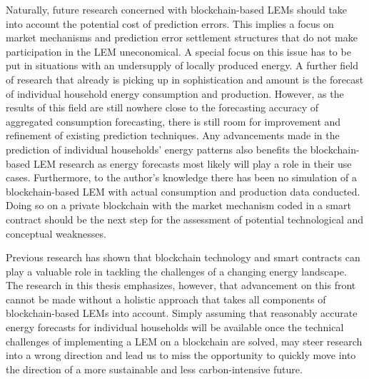 Naturally, future research concerned with blockchain-based LEMs should take into account the potential cost of prediction errors. This implies a focus on market mechanisms and prediction error settlement structures that do not make participation in the LEM uneconomical. A special focus on this issue has to be put in situations with an undersupply of locally produced energy. A further field of research that already is picking up in sophistication and amount is the forecast of individual household energy consumption and production. However, as the results of this field are still nowhere close to the forecasting accuracy of aggregated consumption forecasting, there is still room for improvement and refinement of existing prediction techniques. Any advancements made in the prediction of individual households' energy patterns also benefits the blockchain-based LEM research as energy forecasts most likely will play a role in their use cases. Furthermore, to the author's knowledge there has been no simulation of a blockchain-based LEM with actual consumption and production data conducted. Doing so on a private blockchain with the market mechanism coded in a smart contract should be the next step for the assessment of potential technological and conceptual weaknesses.

Previous research has shown that blockchain technology and smart contracts can play a valuable role in tackling the challenges of a changing energy landscape. The research in this thesis emphasizes, however, that advancement on this front cannot be made without a holistic approach that takes all components of blockchain-based LEMs into account. Simply assuming that reasonably accurate energy forecasts for individual households will be available once the technical challenges of implementing a LEM on a blockchain are solved, may steer research into a wrong direction and lead us to miss the opportunity to quickly move into the direction of a more sustainable and less carbon-intensive future.


